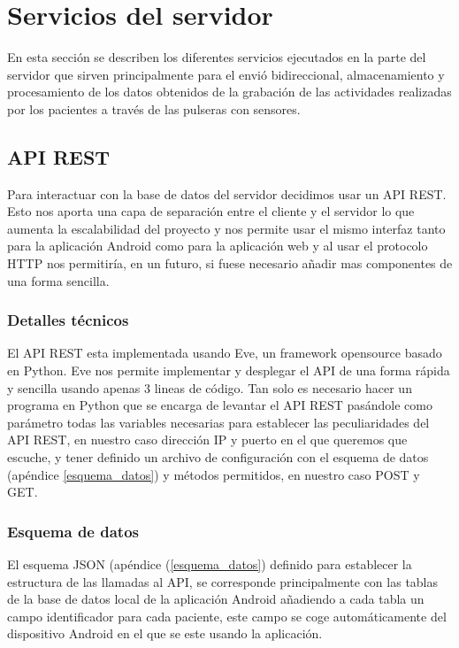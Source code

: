 \documentclass[11pt,spanish]{article}
\begin{document}
\newpage
\section{Servicios del servidor}
En esta sección se describen los diferentes servicios ejecutados en la parte del servidor que sirven principalmente para el envió bidireccional, almacenamiento y procesamiento de los datos obtenidos de la grabación de las actividades realizadas por los pacientes a través de las pulseras con sensores.

\subsection{API REST}
Para interactuar con la base de datos del servidor decidimos usar un API REST. Esto nos aporta una capa de separación entre el cliente y el servidor lo que aumenta la escalabilidad del proyecto y nos permite usar el mismo interfaz tanto para la aplicación Android como para la aplicación web y al usar el protocolo HTTP nos permitiría, en un futuro, si fuese necesario añadir mas componentes de una forma sencilla.

\subsubsection{Detalles técnicos}
El API REST esta implementada usando Eve, un framework opensource basado en Python. Eve nos permite implementar y desplegar el API de una forma rápida y sencilla usando apenas 3 lineas de código. Tan solo es necesario hacer un programa en Python que se encarga de levantar el API REST pasándole como parámetro todas las variables necesarias para establecer las peculiaridades del API REST, en nuestro caso dirección IP y puerto en el que queremos que escuche, y tener definido un archivo de configuración con el esquema de datos (apéndice \ref{esquema_datos}) y métodos permitidos, en nuestro caso POST y GET.

\subsubsection{Esquema de datos}

El esquema JSON (apéndice (\ref{esquema_datos}) definido para establecer la estructura de las llamadas al API, se corresponde principalmente con las tablas de la base de datos local de la aplicación Android añadiendo a cada tabla un campo identificador para cada paciente, este campo se coge automáticamente del dispositivo Android en el que se este usando la aplicación.
\newline
\end{document}
